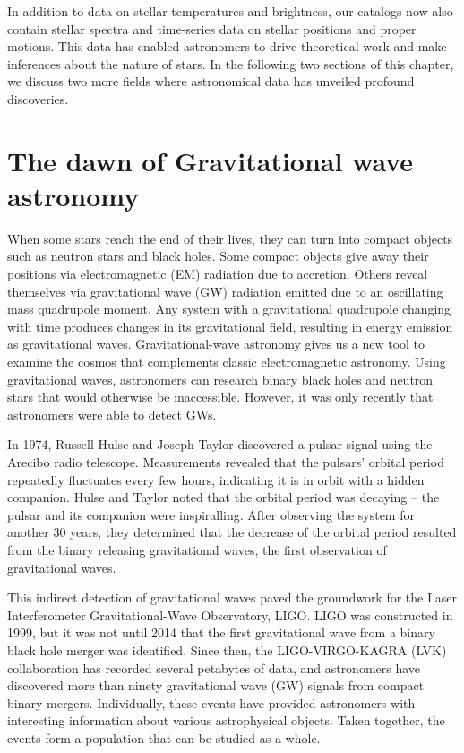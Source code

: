 In addition to data on stellar temperatures and brightness, our catalogs now also contain stellar spectra and time-series data on stellar positions and proper motions.
This data has enabled astronomers to drive theoretical work and make inferences about the nature of stars.
In the following two sections of this chapter, we discuss two more fields where astronomical data has unveiled profound discoveries. 



\section{The dawn of Gravitational wave astronomy}

When some stars reach the end of their lives, they can turn into compact objects such as neutron stars and black holes. 
Some compact objects give away their positions via electromagnetic (EM) radiation due to accretion. 
Others reveal themselves via gravitational wave (GW) radiation emitted due to an oscillating mass quadrupole moment.
Any system with a gravitational quadrupole changing with time produces changes in its gravitational field, resulting in energy emission as gravitational waves.
Gravitational-wave astronomy gives us a new tool to examine the cosmos that complements classic electromagnetic astronomy.
Using gravitational waves, astronomers can research binary black holes and neutron stars that would otherwise be inaccessible.
However, it was only recently that astronomers were able to detect GWs. 

In 1974, Russell Hulse and Joseph Taylor discovered a pulsar signal using the Arecibo radio telescope.
Measurements revealed that the pulsars' orbital period repeatedly fluctuates every few hours, indicating it is in orbit with a hidden companion.
Hulse and Taylor noted that the orbital period was decaying -- the pulsar and its companion were inspiralling.
After observing the system for another 30 years, they determined that the decrease of the orbital period resulted from the binary releasing gravitational waves, the first observation of gravitational waves.

This indirect detection of gravitational waves paved the groundwork for the Laser Interferometer Gravitational-Wave Observatory, LIGO. 
LIGO was constructed in 1999, but it was not until 2014 that the first gravitational wave from a binary black hole merger was identified.
Since then, the LIGO-VIRGO-KAGRA (LVK) collaboration has recorded several petabytes of data, and astronomers have discovered more than ninety gravitational wave (GW) signals from compact binary mergers.
Individually, these events have provided astronomers with interesting information about various astrophysical objects. 
Taken together, the events form a population that can be studied as a whole. 

